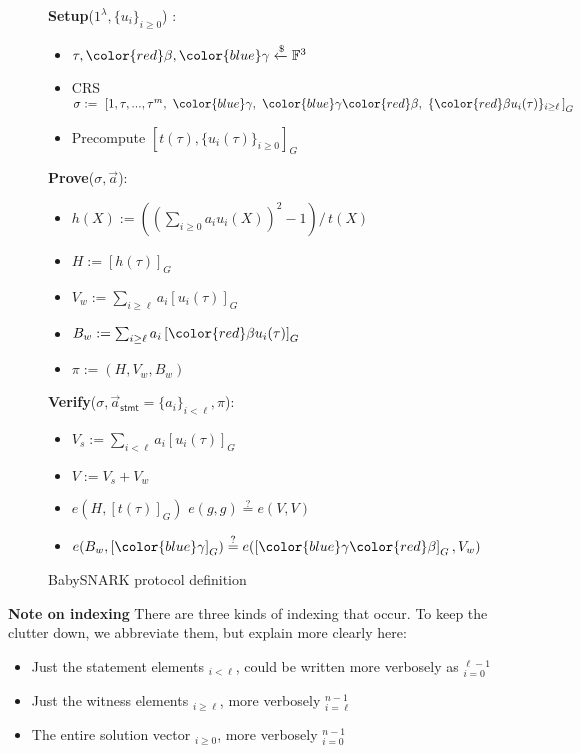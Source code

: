 \documentclass{article}
\theoremstyle{definition}
\theoremstyle{remark}
\newcommand{\F}{\mathbb{F}}
\begin{document}
\begin{figure}[ht]
\textbf{Setup}($1^\lambda,\{u_i\}_{i \ge 0}$) : 

\begin{itemize}
    \item[] $\tau,{\color{red}\beta},{\color{blue}\gamma} \xleftarrow{\$} \F^3$
\item[]CRS $\sigma := \,\, 
                        \left[ %
                         1, \tau,...,{\tau}^m,\,\, {\color{blue}\gamma},\,\,
                         {\color{blue}\gamma}
                         {\color{red}\beta},\,\, 
                       \{{\color{red}\beta} u_i(\tau)\}_{i \ge \ell} \,
                       \right]_G
                      $
   \item[] Precompute $\left[ t(\tau), \{ u_i(\tau) \}_{i \ge 0} \right]_G$
\end{itemize}
\textbf{Prove}($\sigma, \vec{a}$):
\begin{itemize}[parsep=2pt]
\item[] $h(X) :=  \left(\left({\sum_{i\ge 0} a_i u_i(X)}\right)^2 - 1\right) / \, {t(X)}$
\item[] $H := \left[ h(\tau) \right]_G$
\item[] $V_w :=  \sum_{i \ge \ell} a_i \left[u_i(\tau) \right]_G$
\item[] $B_w :=  \sum_{i \ge \ell} a_i \left[ {\color{red}\beta} u_i(\tau) \right]_G$
\item[]  $\pi := (H,V_w,B_w)$
\end{itemize}

\textbf{Verify}($\sigma, \vec{a}_\textsf{stmt}=\{a_i\}_{i<\ell}, \pi$):
\begin{itemize}[parsep=2pt]
\item[] $V_s := \sum_{i<\ell} a_i \left[ u_i(\tau) \right]_G$
\item[] $V := V_s + V_w$
\item[] $e(H,\left[ t(\tau) \right]_G) \,\, e(g,g) \overset{?}{=} e(V,V)$
\item[] $e(B_w, \left[ {\color{blue}\gamma} \right]_G) \overset{?}{=} e( \left[ {\color{blue}\gamma} {\color{red}\beta} \right]_G, V_w)$
\end{itemize}
\caption{BabySNARK protocol definition}
\label{fig:babysnark}
\end{figure}

\textbf{Note on indexing}
There are three kinds of indexing that occur. To keep the clutter down, we abbreviate them, but explain more clearly here:
\begin{itemize}
  \item Just the statement elements $_{i<\ell}$, could be written more verbosely as $_{i=0}^{\ell-1}$
  \item Just the witness elements $_{i\ge\ell}$, more verbosely $_{i=\ell}^{n-1}$
  \item The entire solution vector $_{i\ge0}$, more verbosely $_{i=0}^{n-1}$
\end{itemize}
\end{document}
